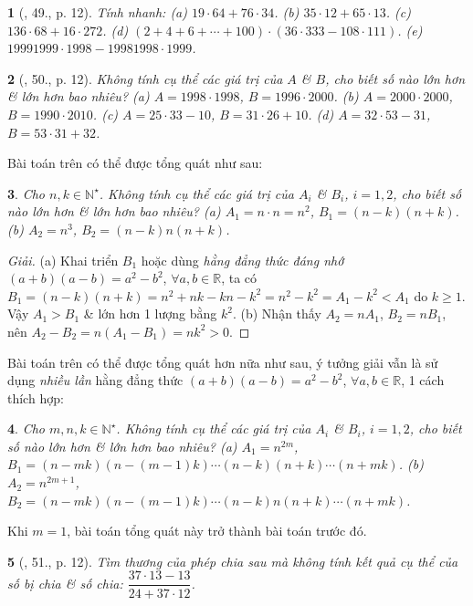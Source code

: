 \documentclass{article}
\newtheorem{baitoan}{}
\begin{document}
\begin{baitoan}[\cite{Binh_Toan_6_tap_1}, 49., p. 12]
	Tính nhanh: (a) $19\cdot64 + 76\cdot34$. (b) $35\cdot12 + 65\cdot13$. (c) $136\cdot68 + 16\cdot272$. (d) $(2 + 4 + 6 + \cdots + 100)\cdot(36\cdot333 - 108\cdot111)$. (e) $19991999\cdot1998 - 19981998\cdot1999$.
\end{baitoan}

\begin{baitoan}[\cite{Binh_Toan_6_tap_1}, 50., p. 12]
	Không tính cụ thể các giá trị của $A$ \& $B$, cho biết số nào lớn hơn \& lớn hơn bao nhiêu? (a) $A = 1998\cdot1998$, $B = 1996\cdot2000$. (b) $A = 2000\cdot2000$, $B = 1990\cdot2010$. (c) $A = 25\cdot33 - 10$, $B = 31\cdot26 + 10$. (d) $A = 32\cdot53 - 31$, $B = 53\cdot31 + 32$.
\end{baitoan}
Bài toán trên có thể được tổng quát như sau:

\begin{baitoan}
	Cho $n,k\in\mathbb{N}^\star$. Không tính cụ thể các giá trị của $A_i$ \& $B_i$, $i = 1,2$, cho biết số nào lớn hơn \& lớn hơn bao nhiêu? (a) $A_1 = n\cdot n = n^2$, $B_1 = (n - k)(n + k)$. (b) $A_2 = n^3$, $B_2 = (n - k)n(n + k)$.
\end{baitoan}

\begin{proof}[Giải]
	(a) Khai triển $B_1$ hoặc dùng \textit{hằng đẳng thức đáng nhớ} $(a + b)(a - b) = a^2 - b^2$, $\forall a,b\in\mathbb{R}$, ta có $B_1 = (n - k)(n + k) = n^2 + nk - kn - k^2 = n^2 - k^2 = A_1 - k^2 < A_1$ do $k\ge 1$. Vậy $A_1 > B_1$ \& lớn hơn 1 lượng bằng $k^2$. (b) Nhận thấy $A_2 = nA_1$, $B_2 = nB_1$, nên $A_2 - B_2 = n(A_1 - B_1) = nk^2 > 0$.
\end{proof}
Bài toán trên có thể được tổng quát hơn nữa như sau, ý tưởng giải vẫn là sử dụng \textit{nhiều lần} hằng đẳng thức $(a + b)(a - b) = a^2 - b^2$, $\forall a,b\in\mathbb{R}$, 1 cách thích hợp:

\begin{baitoan}
	Cho $m,n,k\in\mathbb{N}^\star$. Không tính cụ thể các giá trị của $A_i$ \& $B_i$, $i = 1,2$, cho biết số nào lớn hơn \& lớn hơn bao nhiêu? (a) $A_1 = n^{2m}$, $B_1 = (n - mk)(n - (m - 1)k)\cdots(n - k)(n + k)\cdots(n + mk)$. (b) $A_2 = n^{2m + 1}$, $B_2 = (n - mk)(n - (m - 1)k)\cdots(n - k)n(n + k)\cdots(n + mk)$.
\end{baitoan}
Khi $m = 1$, bài toán tổng quát này trở thành bài toán trước đó.

\begin{baitoan}[\cite{Binh_Toan_6_tap_1}, 51., p. 12]
	Tìm thương của phép chia sau mà không tính kết quả cụ thể của số bị chia \& số chia: $\dfrac{37\cdot13 - 13}{24 + 37\cdot12}$.
\end{baitoan}
\end{document}

